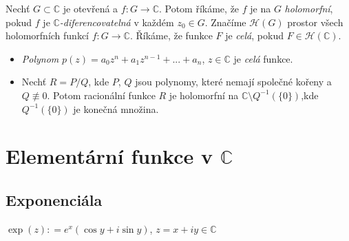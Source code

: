 
\begin{definition}
Nechť $G\subset \mathbb{C}$ je otevřená %
a $f \colon G \to \mathbb{C}$.
Potom říkáme, že $f$ je na $G$ \emph{holomorfní}, pokud $f$ je  $\mathbb{C}$\emph{-diferencovatelná} v každém $z_{0}\in {G}$. Značíme $\mathcal{H}(G)$ prostor všech holomorfních funkcí $f \colon G \to \mathbb{C}$. Říkáme, že funkce $F$ je \emph{celá}, pokud $F\in \mathcal{H}(\mathbb{C})$.
\end{definition}
\begin{example}\mbox{}
\begin{itemize}
    \item \emph{Polynom} $p(z) = a_0z^{n}+a_1z^{n-1}+...+a_n$, $z\in \mathbb{C}$ je \emph{celá} funkce.
    \item Nechť $R=P/Q$, kde $P$, $Q$ jsou polynomy, které nemají společné kořeny a $Q\not\equiv 0$. Potom racionální funkce $R$ je holomorfní na $\mathbb{C}\setminus Q^{-1}(\{0\})$,kde $Q^{-1}(\{0\})$ je konečná množina.
\end{itemize}    
\end{example}


\section{Elementární funkce v \texorpdfstring{$\mathbb{C}$}{C}}
\subsection{Exponenciála}

\begin{definition}
$\exp(z)\colon=e^{x}(\cos y + i\sin y)$, $z=x+i y\in \mathbb{C}$
\end{definition}

